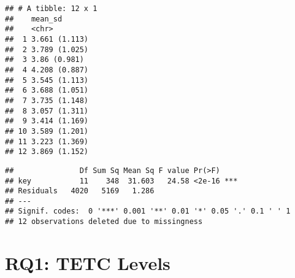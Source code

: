 \documentclass[]{article}
\newenvironment{Shaded}{\begin{snugshade}}{\end{snugshade}}
\newcommand{\KeywordTok}[1]{\textcolor[rgb]{0.13,0.29,0.53}{\textbf{#1}}}
\newcommand{\DataTypeTok}[1]{\textcolor[rgb]{0.13,0.29,0.53}{#1}}
\newcommand{\StringTok}[1]{\textcolor[rgb]{0.31,0.60,0.02}{#1}}
\newcommand{\OtherTok}[1]{\textcolor[rgb]{0.56,0.35,0.01}{#1}}
\newcommand{\OperatorTok}[1]{\textcolor[rgb]{0.81,0.36,0.00}{\textbf{#1}}}
\newcommand{\NormalTok}[1]{#1}
\begin{document}
\begin{verbatim}
## # A tibble: 12 x 1
##    mean_sd      
##    <chr>        
##  1 3.661 (1.113)
##  2 3.789 (1.025)
##  3 3.86 (0.981) 
##  4 4.208 (0.887)
##  5 3.545 (1.113)
##  6 3.688 (1.051)
##  7 3.735 (1.148)
##  8 3.057 (1.311)
##  9 3.414 (1.169)
## 10 3.589 (1.201)
## 11 3.223 (1.369)
## 12 3.869 (1.152)
\end{verbatim}

\begin{Shaded}
\end{Shaded}

\begin{verbatim}
##               Df Sum Sq Mean Sq F value Pr(>F)    
## key           11    348  31.603   24.58 <2e-16 ***
## Residuals   4020   5169   1.286                   
## ---
## Signif. codes:  0 '***' 0.001 '**' 0.01 '*' 0.05 '.' 0.1 ' ' 1
## 12 observations deleted due to missingness
\end{verbatim}

\section{RQ1: TETC Levels}\label{rq1-tetc-levels}

\begin{Shaded}
\end{Shaded}
\end{document}
